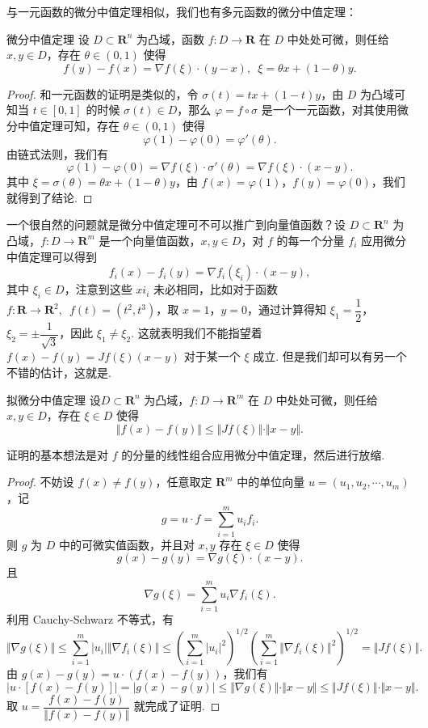 与一元函数的微分中值定理相似，我们也有多元函数的微分中值定理：

\begin{theorem}{微分中值定理}{}
    设 $D\subset \mathbf{R}^n$ 为凸域，函数 $f:D\to \mathbf{R}$ 在 $D$ 中处处可微，则任给 $x,y\in D$，存在 $\theta\in (0, 1)$ 使得\[f(y) - f(x) = \nabla f(\xi)\cdot(y-x),\enspace \xi=\theta x + (1-\theta)y.\]
\end{theorem}

\begin{proof}
    和一元函数的证明是类似的，令 $\sigma(t) = tx + (1 - t)y$，由 $D$ 为凸域可知当 $t\in [0, 1]$ 的时候 $\sigma(t)\in D$，那么 $\varphi = f\circ \sigma$ 是一个一元函数，对其使用微分中值定理可知，存在 $\theta\in (0, 1)$ 使得 \[\varphi(1) - \varphi(0) = \varphi'(\theta).\]
    由链式法则，我们有 \[\varphi(1) - \varphi(0) = \nabla f(\xi)\cdot\sigma'(\theta) = \nabla f(\xi)\cdot(x - y).\]
    其中 $\xi = \sigma(\theta) = \theta x + (1 - \theta)y$，由 $f(x) = \varphi(1)$，$f(y) = \varphi(0)$，我们就得到了结论.
\end{proof}

一个很自然的问题就是微分中值定理可不可以推广到向量值函数？设 $D\subset \mathbf{R}^n$ 为凸域，$f: D\to \mathbf{R}^m$ 是一个向量值函数，$x, y\in D$，对 $f$ 的每一个分量 $f_i$ 应用微分中值定理可以得到\[f_i(x) - f_i(y) = \nabla f_i(\xi_i)\cdot(x-y),\]其中 $\xi_i\in D$，注意到这些 $xi_i$ 未必相同，比如对于函数 $f: \mathbf{R}\to\mathbf{R}^2,\enspace f(t) = (t^2, t^3)$，取 $x = 1$，$y = 0$，通过计算得知 $\xi_1 = \dfrac{1}{2}$，$\xi_2 = \pm\dfrac{1}{\sqrt{3}}$，因此 $\xi_1 \neq \xi_2$. 这就表明我们不能指望着 $f(x) - f(y) = Jf(\xi)(x-y)$ 对于某一个 $\xi$ 成立. 但是我们却可以有另一个不错的估计，这就是.

\begin{theorem}{拟微分中值定理}{}
    设$D\subset \mathbf{R}^n$ 为凸域，$f: D\to \mathbf{R}^m$ 在 $D$ 中处处可微，则任给 $x, y\in D$，存在 $\xi\in D$ 使得\[\Vert f(x) - f(y)\Vert \leqslant \Vert Jf(\xi)\Vert\cdot \Vert x - y\Vert.\]
\end{theorem}

证明的基本想法是对 $f$ 的分量的线性组合应用微分中值定理，然后进行放缩.

\begin{proof}
    不妨设 $f(x) \neq f(y)$，任意取定 $\mathbf{R}^m$ 中的单位向量 $u = (u_1, u_2, \cdots, u_m)$，记\[g = u\cdot f = \sum_{i = 1}^{m}u_if_i.\]
    则 $g$ 为 $D$ 中的可微实值函数，并且对 $x, y$ 存在 $\xi\in D$ 使得 \[g(x) - g(y) = \nabla g(\xi)\cdot (x - y).\]
    且 \[\nabla g(\xi) = \sum_{i = 1}^{m}u_i\nabla f_i(\xi).\]
    利用 Cauchy-Schwarz 不等式，有 \[\Vert \nabla g(\xi)\Vert \leqslant \sum_{i = 1}^m\vert u_i\vert \Vert \nabla f_i(\xi)\Vert \leqslant \left(\sum_{i = 1}^m\vert u_i\vert^2\right)^{1/2}\left(\sum_{i = 1}^m\Vert \nabla f_i(\xi)\Vert^2\right)^{1/2} = \Vert Jf(\xi)\Vert.\]
    由 $g(x) - g(y) = u\cdot (f(x) - f(y))$，我们有 \[\vert u \cdot [f(x) - f(y)]\vert = \vert g(x) - g(y) \vert \leqslant \Vert \nabla g(\xi)\Vert \cdot \Vert x - y\Vert \leqslant \Vert Jf(\xi)\Vert\cdot \Vert x - y\Vert.\]
    取 $u = \dfrac{f(x) - f(y)}{\Vert f(x) - f(y)\Vert}$ 就完成了证明.
\end{proof}

